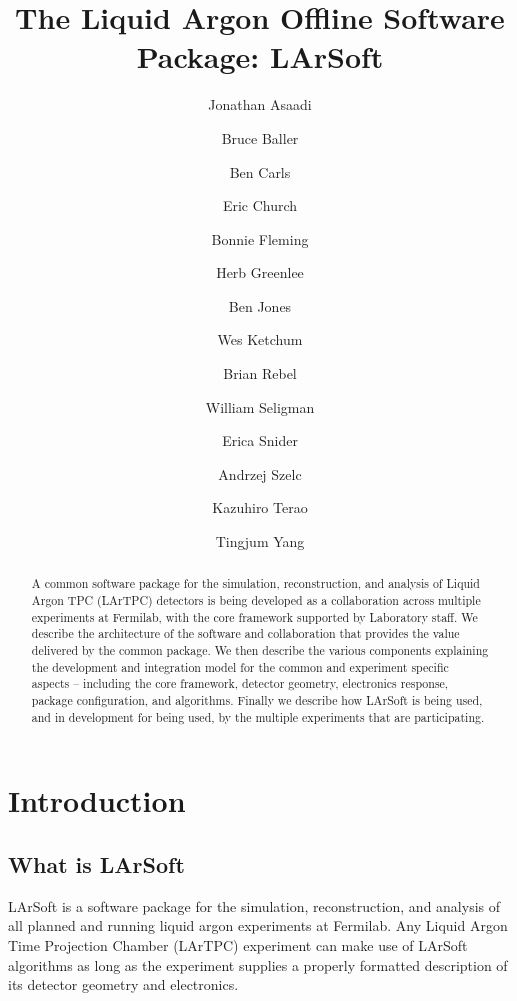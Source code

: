 \documentclass[12pt]{elsarticle}
\begin{document}
\title{The Liquid Argon Offline Software Package: LArSoft} 
\author{Jonathan Asaadi}
\address{}
\ead{}
\author{Bruce Baller}
\address{}
\ead{}
\author{Ben Carls}
\address{}
\ead{}

\author{Eric Church}
\address{Yale University, PO Box 500, MS309, Fermi National Accelerator Lab, Batavia, IL, USA, 60510-5011}
\author{Bonnie Fleming}
\address{Yale University, PO Box XYZ, Physics Department, Yale University, New Haven, CT, USA, 12345-1234}
\author{Herb Greenlee}
\address{}
\ead{}
\author{Ben Jones}
\address{}
\ead{}
\author{Wes Ketchum}
\address{}
\ead{}
\author{Brian Rebel}
\address{PO Box XYZ, MS309, Fermi National Accelerator Lab, Batavia, IL, USA, 60510-5011}
\author{William Seligman}
\address{}
\ead{}
\author{Erica Snider}
\address{}
\ead{}

\author{Andrzej Szelc}
\address{}
\ead{}

\author{Kazuhiro Terao}
\address{}
\ead{}
\author{Tingjum Yang}
\address{}
\ead{}
\begin{abstract}
A common software package for the simulation, reconstruction, and analysis of Liquid Argon TPC (LArTPC) detectors is being developed as a collaboration across multiple experiments at Fermilab, with the core framework supported by Laboratory staff. We describe the architecture of the software and collaboration that provides the value delivered by the common package. We then describe the various components explaining the development and integration model for the common and experiment specific aspects – including the core framework, detector geometry, electronics response, package configuration, and algorithms. Finally we describe how LArSoft is being used, and in development for being used, by the multiple experiments that are participating.

\end{abstract}
\maketitle

\section{Introduction}
\subsection{What is LArSoft}
LArSoft is a software package for the simulation, reconstruction, and analysis of all planned and running liquid argon experiments at Fermilab. Any Liquid Argon Time Projection Chamber (LArTPC) experiment can make use of LArSoft algorithms as long as the experiment supplies a properly formatted description of its detector geometry and electronics. 
\end{document}
